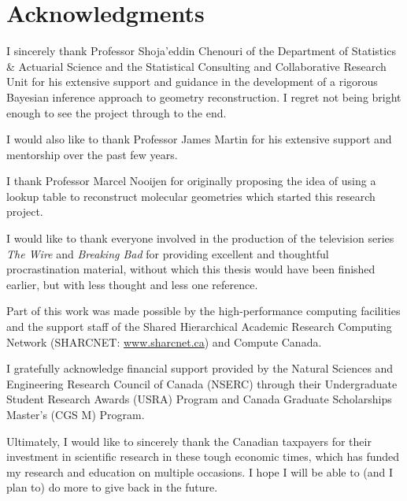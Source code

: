 
\begingroup
\let\clearpage\relax
\let\cleardoublepage\relax
\let\cleardoublepage\relax
\chapter*{Acknowledgments}


I sincerely thank Professor Shoja'eddin Chenouri of the Department of Statistics \& Actuarial Science and the Statistical Consulting and Collaborative Research Unit for his extensive support and guidance in the development of a rigorous Bayesian inference approach to geometry reconstruction. I regret not being bright enough to see the project through to the end.

I would also like to thank Professor James Martin for his extensive support and mentorship over the past few years.

I thank Professor Marcel Nooijen for originally proposing the idea of using a lookup table to reconstruct molecular geometries which started this research project.


I would like to thank everyone involved in the production of the television series \emph{The Wire} and \emph{Breaking Bad} for providing excellent and thoughtful procrastination material, without which this thesis would have been finished earlier, but with less thought and less one reference.

Part of this work was made possible by the high-performance computing facilities and the support staff of the Shared Hierarchical Academic Research Computing Network (SHARCNET: \href{www.sharcnet.ca}{www.sharcnet.ca}) and Compute Canada.

I gratefully acknowledge financial support provided by the Natural Sciences and Engineering Research Council of Canada (NSERC) through their Undergraduate Student Research Awards (USRA) Program and Canada Graduate Scholarships Master's (CGS M) Program.

Ultimately, I would like to sincerely thank the Canadian taxpayers for their investment in scientific research in these tough economic times, which has funded my research and education on multiple occasions. I hope I will be able to (and I plan to) do more to give back in the future.

\endgroup